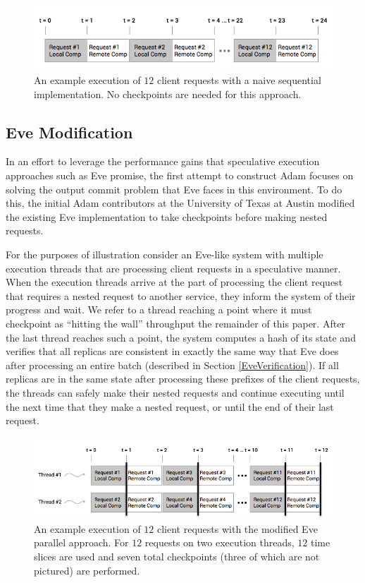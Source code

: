 \documentclass[11pt, oneside]{report}
\begin{document}
\begin{figure}[h]
\centering
\includegraphics[width=1.0\textwidth]{NaiveSequential.png}
\caption{\label{NaiveSequential}An example execution of $12$ client requests with a naive sequential implementation. No checkpoints are needed for this approach.}
\end{figure}

\subsection{Eve Modification}\label{EveModification}

In an effort to leverage the performance gains that speculative execution approaches such as Eve promise, the first attempt to construct Adam focuses on solving the output commit problem that Eve faces in this environment. 
To do this, the initial Adam contributors at the University of Texas at Austin modified the existing Eve implementation to take checkpoints before making nested requests. 

For the purposes of illustration consider an Eve-like system with multiple execution threads that are processing client requests in a speculative manner. 
When the execution threads arrive at the part of processing the client request that requires a nested request to another service, they inform the system of their progress and wait.
We refer to a thread reaching a point where it must checkpoint as ``hitting the wall'' throughput the remainder of this paper.
After the last thread reaches such a point, the system computes a hash of its state and verifies that all replicas are consistent in exactly the same way that Eve does after processing an entire batch (described in Section \ref{EveVerification}). 
If all replicas are in the same state after processing these prefixes of the client requests, the threads can safely make their nested requests and continue executing until the next time that they make a nested request, or until the end of their last request.

\begin{figure}[h]
\centering
\includegraphics[width=1.0\textwidth]{Parallel.png}
\caption{\label{parallel}An example execution of $12$ client requests with the modified Eve parallel approach. For $12$ requests on two execution threads, $12$ time slices are used and seven total checkpoints (three of which are not pictured) are performed.}
\end{figure}
\end{document}
